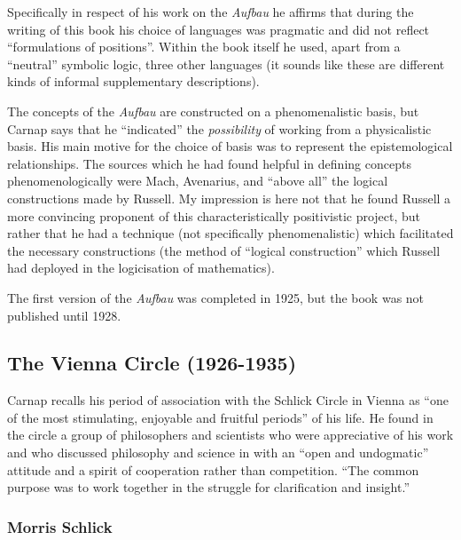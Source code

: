 \documentclass[10pt,titlepage]{book}
\begin{document}
Specifically in respect of his work on the \emph{Aufbau} he affirms that during the writing of this book his choice of languages was pragmatic and did not reflect ``formulations of positions''.
Within the book itself he used, apart from a ``neutral'' symbolic logic, three other languages (it sounds like these are different kinds of informal supplementary descriptions).

The concepts of the \emph{Aufbau} are constructed on a phenomenalistic basis, but Carnap says that he ``indicated'' the \emph{possibility} of working from a physicalistic basis.
His main motive for the choice of basis was to represent the epistemological relationships.
The sources which he had found helpful in defining concepts phenomenologically were Mach, Avenarius, and ``above all'' the logical constructions made by Russell.
My impression is here not that he found Russell a more convincing proponent of this characteristically positivistic project, but rather that he had a technique (not specifically phenomenalistic) which facilitated the necessary constructions (the method of ``logical construction'' which Russell had deployed in the logicisation of mathematics).

The first version of the \emph{Aufbau} was completed in 1925, but the book was not published until 1928.

\subsection{The Vienna Circle (1926-1935)}

Carnap recalls his period of association with the Schlick Circle in Vienna as ``one of the most stimulating, enjoyable and fruitful periods'' of his life.
He found in the circle a group of philosophers and scientists who were appreciative of his work and who discussed philosophy and science in with an ``open and undogmatic'' attitude and a spirit of cooperation rather than competition.
``The common purpose was to work together in the struggle for clarification and insight.''

\subsubsection{Morris Schlick}
\end{document}
